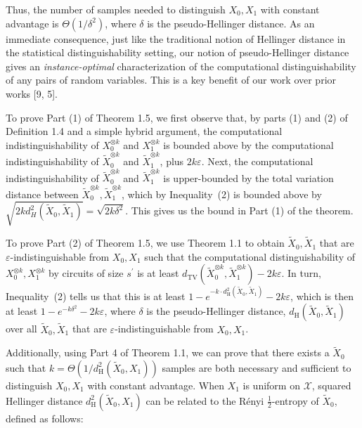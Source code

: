 \documentclass[10pt,a4paper]{article}
\begin{document}



Thus, the number of samples needed to distinguish $X_{0},X_{1}$ with constant advantage is $\Theta(1/\delta^{2})$, where $\delta$ is the pseudo-Hellinger distance. As an immediate consequence, just like the traditional notion of Hellinger distance in the statistical distinguishability setting, our notion of pseudo-Hellinger distance gives an \emph{instance-optimal} characterization of the computational distinguishability of any pairs of random variables. This is a key benefit of our work over prior works [9, 5].\par




To prove Part (1) of Theorem 1.5, we first observe that, by parts (1) and (2) of Definition 1.4 and a simple hybrid argument, the computational indistinguishability of $X_{0}^{\otimes k}$ and $X_{1}^{\otimes k}$ is bounded above by the computational indistinguishability of $\widetilde{X}_{0}^{\otimes k}$ and $\widetilde{X}_{1}^{\otimes k}$, plus $2k\varepsilon$. Next, the computational indistinguishability of $\widetilde{X}_{0}^{\otimes k}$ and $\widetilde{X}_{1}^{\otimes k}$ is upper-bounded by the total variation distance between $\widetilde{X}_{0}^{\otimes k},\widetilde{X}_{1}^{\otimes k}$, which by Inequality (2) is bounded above by $\sqrt{2kd_{H}^{2}(\widetilde{X}_{0},\widetilde{X}_{1})}=\sqrt{2k\delta^{2}}$. This gives us the bound in Part (1) of the theorem.\par




To prove Part (2) of Theorem 1.5, we
use Theorem 1.1 to obtain $\widetilde{X}_{0},\widetilde{X}_{1}$ that are $\varepsilon$-indistinguishable from $X_{0},X_{1}$ such that the computational distinguishability of $X_{0}^{\otimes k},X_{1}^{\otimes k}$ by circuits of size $s^{\prime}$ is at least $d_{\mathrm{TV}}(\widetilde{X}_{0}^{\otimes k},\widetilde{X}_{1}^{\otimes k})-2k\varepsilon$. In turn, Inequality (2) tells us that this is at least $1-e^{-k\cdot d^{2}_{\mathrm{H}}(\widetilde{X}_{0},\widetilde{X}_{1})}-2k\varepsilon$, which is then at least $1-e^{-k\delta^{2}}-2k\varepsilon$, where $\delta$ is the pseudo-Hellinger distance, $d_{\mathrm{H}}(\widetilde{X}_{0},\widetilde{X}_{1})$ over all $\widetilde{X}_{0},\widetilde{X}_{1}$ that are $\varepsilon$-indistinguishable from $X_{0},X_{1}$.\par




Additionally, using Part 4 of Theorem 1.1, we can prove that there exists a $\widetilde{X}_{0}$ such that $k=\Theta\left(1/d^{2}_{\mathrm{H}}(\widetilde{X}_{0},X_{1})\right)$ samples are both necessary and sufficient to distinguish $X_{0},X_{1}$ with constant
advantage. When $X_{1}$ is uniform on $\mathcal{X}$, squared Hellinger distance $d^{2}_{\mathrm{H}}(\widetilde{X}_{0},X_{1})$ can be related to the Rényi $\frac{1}{2}$-entropy of $\widetilde{X}_{0}$, defined as follows:\par
\end{document}
